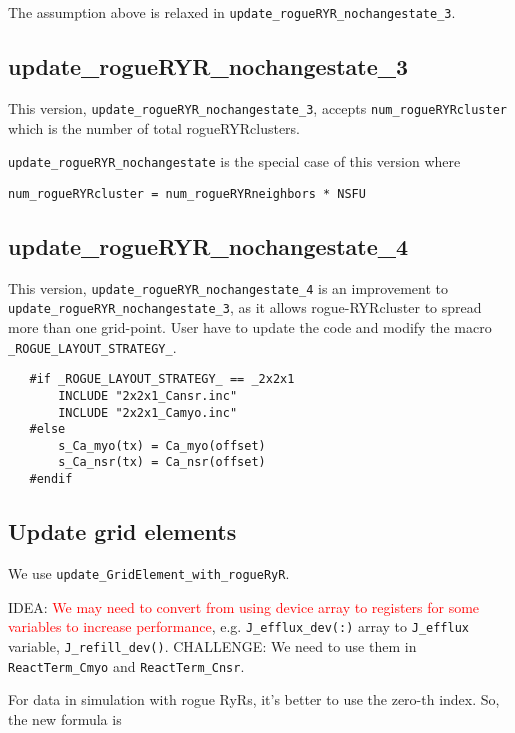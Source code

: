 The assumption above is relaxed in \verb!update_rogueRYR_nochangestate_3!.

\subsection{update\_rogueRYR\_nochangestate\_3}

This version, \verb!update_rogueRYR_nochangestate_3!, accepts
\verb!num_rogueRYRcluster! which is the number of total rogueRYRclusters.

\verb!update_rogueRYR_nochangestate! is the special case of this version where
\begin{verbatim}
num_rogueRYRcluster = num_rogueRYRneighbors * NSFU
\end{verbatim}

\subsection{update\_rogueRYR\_nochangestate\_4}

This version, \verb!update_rogueRYR_nochangestate_4! is an improvement to
\verb!update_rogueRYR_nochangestate_3!, as it allows rogue-RYRcluster to spread
more than one grid-point. User have to update the code and modify the macro
\verb!_ROGUE_LAYOUT_STRATEGY_!.
 
\begin{verbatim}
   #if _ROGUE_LAYOUT_STRATEGY_ == _2x2x1
       INCLUDE "2x2x1_Cansr.inc"
       INCLUDE "2x2x1_Camyo.inc"
   #else
       s_Ca_myo(tx) = Ca_myo(offset)
       s_Ca_nsr(tx) = Ca_nsr(offset)
   #endif    
\end{verbatim}


\subsection{Update grid elements}

We use \verb!update_GridElement_with_rogueRyR!. 


\begin{framed}
IDEA: \textcolor{red}{We may need to convert from using device array to
registers for some variables to increase performance}, e.g. \verb!J_efflux_dev(:)! array
to \verb!J_efflux! variable, \verb!J_refill_dev()!. CHALLENGE: We need to use
them in \verb!ReactTerm_Cmyo! and \verb!ReactTerm_Cnsr!.
\end{framed}

For data in simulation with rogue RyRs, it's better to use the zero-th
index. So, the new formula is

